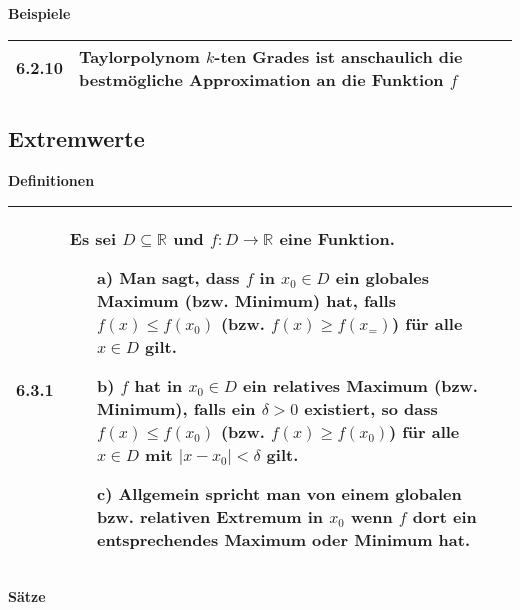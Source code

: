     

    \noindent
    \textbf{Beispiele}
    
    \begin{longtable}{p{1cm} p{16cm}}
        \toprule

        6.2.10& Taylorpolynom $k$-ten Grades ist anschaulich die bestmögliche Approximation an die Funktion $f$ \\

        \bottomrule
    \end{longtable}
    

\subsection{Extremwerte}

    \noindent
    \textbf{Definitionen}
      
    \begin{longtable}{p{1cm} p{16cm}}
        \toprule

        6.3.1 & Es sei $D \subseteq \mathbb{R}$ und $f: D \rightarrow \mathbb{R}$ eine Funktion.
                \begin{itemize}[topsep=-0.5cm]
                    \item[a)] Man sagt, dass $f$ in $x_0 \in D$ ein \textbf{globales Maximum} (bzw. Minimum) hat, falls $f(x) \leq f(x_0)$
                                (bzw. $f(x) \geq f(x_=)$) für alle $x \in D$ gilt.
                    \item[b)] $f$ hat in $x_0 \in D$ ein \textbf{relatives Maximum} (bzw. Minimum), falls ein $\delta > 0$ existiert, so dass $f(x) \leq f(x_0)$
                                (bzw. $f(x) \geq f(x_0)$) für alle $x \in D$ mit $|x-x_0| < \delta$ gilt.
                    \item[c)] Allgemein spricht man von einem globalen bzw. relativen \textbf{Extremum} in $x_0$ wenn $f$ dort ein entsprechendes
                                Maximum oder Minimum hat.
                \end{itemize} \vspace{-0cm} \\

        \bottomrule

    \end{longtable}
    

    \noindent 
    \textbf{Sätze}
    
